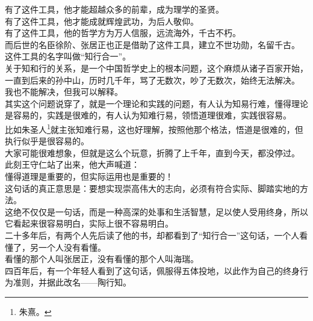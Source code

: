 \begin{multicols}{\theparacolNo}
有了这件工具，他才能超越众多的前辈，成为理学的圣贤。\\

有了这件工具，他才能成就辉煌武功，为后人敬仰。\\

有了这件工具，他的哲学方为万人信服，远流海外，千古不朽。\\

而后世的名臣徐阶、张居正也正是借助了这件工具，建立不世功勋，名留千古。\\

这件工具的名字叫做“知行合一”。\\

关于知和行的关系，是一个中国哲学史上的根本问题，这个麻烦从诸子百家开始，一直到后来的孙中山，历时几千年，骂了无数次，吵了无数次，始终无法解决。\\

我也不能解决，但我可以解释。\\

其实这个问题说穿了，就是一个理论和实践的问题，有人认为知易行难，懂得理论是容易的，实践是很难的，有人认为知难行易，领悟道理很难，实践很容易。\\

比如朱圣人\footnote{朱熹。}就主张知难行易，这也好理解，按照他那个格法，悟道是很难的，但执行似乎是很容易的。\\

大家可能很难想象，但就是这么个玩意，折腾了上千年，直到今天，都没停过。\\

此刻王守仁站了出来，他大声喊道：\\

懂得道理是重要的，但实际运用也是重要的！\\

这句话的真正意思是：要想实现崇高伟大的志向，必须有符合实际、脚踏实地的方法。\\

这绝不仅仅是一句话，而是一种高深的处事和生活智慧，足以使人受用终身，所以它看起来很容易明白，实际上很不容易明白。\\

二十多年后，有两个人先后读了他的书，却都看到了“知行合一”这句话，一个人看懂了，另一个人没有看懂。\\

看懂的那个人叫张居正，没有看懂的那个人叫海瑞。\\

四百年后，有一个年轻人看到了这句话，佩服得五体投地，以此作为自己的终身行为准则，并据此改名——陶行知。\\


\end{multicols}
